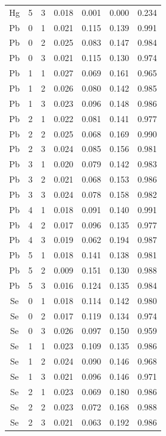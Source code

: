 \documentclass[ms, hidelinks]{uncgdissertationexp}
\theoremstyle{plain}
\theoremstyle{definition}
\theoremstyle{remark}
\begin{document}
\begin{longtable}{ccccccc}
Hg & 5 & 3 & 0.018 & 0.001 & 0.000 & 0.234\\
\rowcolor{gray!6}  Pb & 0 & 1 & 0.021 & 0.115 & 0.139 & 0.991\\
Pb & 0 & 2 & 0.025 & 0.083 & 0.147 & 0.984\\
\rowcolor{gray!6}  Pb & 0 & 3 & 0.021 & 0.115 & 0.130 & 0.974\\
Pb & 1 & 1 & 0.027 & 0.069 & 0.161 & 0.965\\
\rowcolor{gray!6}  Pb & 1 & 2 & 0.026 & 0.080 & 0.142 & 0.985\\
Pb & 1 & 3 & 0.023 & 0.096 & 0.148 & 0.986\\
\rowcolor{gray!6}  Pb & 2 & 1 & 0.022 & 0.081 & 0.141 & 0.977\\
Pb & 2 & 2 & 0.025 & 0.068 & 0.169 & 0.990\\
\rowcolor{gray!6}  Pb & 2 & 3 & 0.024 & 0.085 & 0.156 & 0.981\\
Pb & 3 & 1 & 0.020 & 0.079 & 0.142 & 0.983\\
\rowcolor{gray!6}  Pb & 3 & 2 & 0.021 & 0.068 & 0.153 & 0.986\\
Pb & 3 & 3 & 0.024 & 0.078 & 0.158 & 0.982\\
\rowcolor{gray!6}  Pb & 4 & 1 & 0.018 & 0.091 & 0.140 & 0.991\\
Pb & 4 & 2 & 0.017 & 0.096 & 0.135 & 0.977\\
\rowcolor{gray!6}  Pb & 4 & 3 & 0.019 & 0.062 & 0.194 & 0.987\\
Pb & 5 & 1 & 0.018 & 0.141 & 0.138 & 0.981\\
\rowcolor{gray!6}  Pb & 5 & 2 & 0.009 & 0.151 & 0.130 & 0.988\\
Pb & 5 & 3 & 0.016 & 0.124 & 0.135 & 0.984\\
\rowcolor{gray!6}  Se & 0 & 1 & 0.018 & 0.114 & 0.142 & 0.980\\
Se & 0 & 2 & 0.017 & 0.119 & 0.134 & 0.974\\
\rowcolor{gray!6}  Se & 0 & 3 & 0.026 & 0.097 & 0.150 & 0.959\\
Se & 1 & 1 & 0.023 & 0.109 & 0.135 & 0.986\\
\rowcolor{gray!6}  Se & 1 & 2 & 0.024 & 0.090 & 0.146 & 0.968\\
Se & 1 & 3 & 0.021 & 0.096 & 0.146 & 0.971\\
\rowcolor{gray!6}  Se & 2 & 1 & 0.023 & 0.069 & 0.180 & 0.986\\
Se & 2 & 2 & 0.023 & 0.072 & 0.168 & 0.988\\
\rowcolor{gray!6}  Se & 2 & 3 & 0.021 & 0.063 & 0.192 & 0.986\\

\end{longtable}
\end{document}
